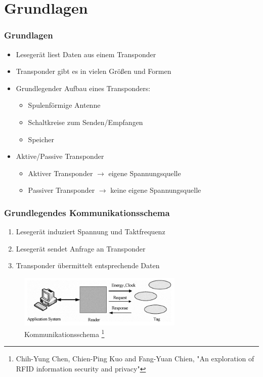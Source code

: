 \documentclass{beamer}
\begin{document}
\section{Grundlagen}
\begin{frame}
\frametitle{Grundlagen}
\begin{itemize}
	\item Lesegerät liest Daten aus einem Transponder
	\item Transponder gibt es in vielen Größen und Formen
	\item Grundlegender Aufbau eines Transponders:
	\begin{itemize}
		\item Spulenförmige Antenne
		\item Schaltkreise zum Senden/Empfangen
		\item Speicher
	\end{itemize}
	
	\item Aktive/Passive Transponder
	\begin{itemize}
		\item Aktiver Transponder $\rightarrow$ eigene Spannungsquelle
		\item Passiver Transponder $\rightarrow$ keine eigene Spannungsquelle
	\end{itemize}
\end{itemize}
\end{frame}


\begin{frame}
\frametitle{Grundlegendes Kommunikationsschema}

\begin{enumerate}
	\item Lesegerät induziert Spannung und Taktfrequenz
	\item Lesegerät sendet Anfrage an Transponder
	\item Transponder übermittelt entsprechende Daten
\end{enumerate}

\begin{figure}
\includegraphics[width=0.7\textwidth]{img/kommunikation.png}
\caption{Kommunikationsschema \footnote{Chih-Yung Chen, Chien-Ping Kuo and Fang-Yuan Chien, "An exploration of RFID information security and privacy"}}
\end{figure}
\end{frame}
\end{document}
